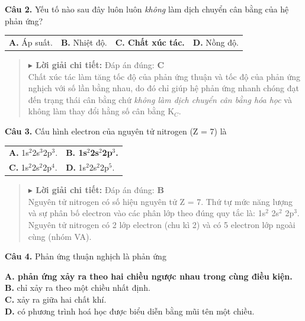 \documentclass[11pt,a4paper]{article}
\begin{document}
\textbf{Câu 2.} Yếu tố nào sau đây luôn luôn \textit{không} làm dịch chuyển cân bằng của hệ phản ứng?

\begin{tabularx}{\textwidth}{@{}XXXX@{}}
\textbf{A.} Áp suất. & \textbf{B.} Nhiệt độ. & \textbf{\color{red} C. Chất xúc tác.} & \textbf{D.} Nồng độ. \\
\end{tabularx}

\begin{quote}\small
{\color{myBlue}\textbf{$\blacktriangleright$ Lời giải chi tiết:}} Đáp án đúng: \textbf{\color{red} C}\\
Chất xúc tác làm tăng tốc độ của phản ứng thuận và tốc độ của phản ứng nghịch với số lần bằng nhau, do đó chỉ giúp hệ phản ứng nhanh chóng đạt đến trạng thái cân bằng chứ \textit{không làm dịch chuyển cân bằng hóa học} và không làm thay đổi hằng số cân bằng K$_{C}$.
\end{quote}
\vspace{2pt}

\textbf{Câu 3.} Cấu hình electron của nguyên tử nitrogen (Z = 7) là

\begin{tabularx}{\textwidth}{@{}XX@{}}
\textbf{A.} 1s$^{2}$2s$^{3}$2p$^{3}$. & \textbf{\color{red} B. 1s$^{2}$2s$^{2}$2p$^{3}$.} \\
\textbf{C.} 1s$^{2}$2s$^{2}$2p$^{4}$. & \textbf{D.} 1s$^{2}$2s$^{2}$2p$^{5}$. \\
\end{tabularx}

\begin{quote}\small
{\color{myBlue}\textbf{$\blacktriangleright$ Lời giải chi tiết:}} Đáp án đúng: \textbf{\color{red} B}\\
Nguyên tử nitrogen có số hiệu nguyên tử Z = 7. Thứ tự mức năng lượng và sự phân bố electron vào các phân lớp theo đúng quy tắc là: 1s$^{2}$ 2s$^{2}$ 2p$^{3}$. Nguyên tử nitrogen có 2 lớp electron (chu kì 2) và có 5 electron lớp ngoài cùng (nhóm VA).
\end{quote}
\vspace{2pt}

\textbf{Câu 4.} Phản ứng thuận nghịch là phản ứng

\quad \textbf{\color{red} A. phản ứng xảy ra theo hai chiều ngược nhau trong cùng điều kiện.}\\
\quad \textbf{B.} chỉ xảy ra theo một chiều nhất định.\\
\quad \textbf{C.} xảy ra giữa hai chất khí.\\
\quad \textbf{D.} có phương trình hoá học được biểu diễn bằng mũi tên một chiều.\\
\end{document}
